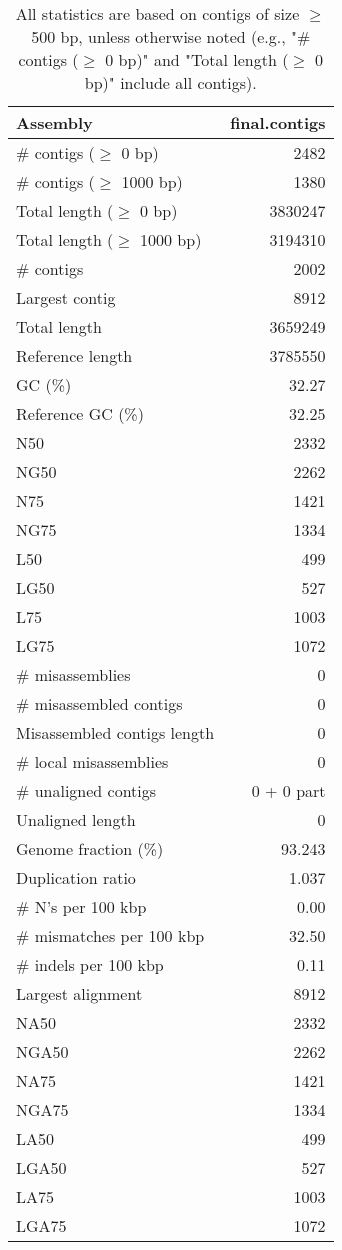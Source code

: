 \documentclass[12pt,a4paper]{article}
\begin{document}
\begin{table}[ht]
\begin{center}
\caption{All statistics are based on contigs of size $\geq$ 500 bp, unless otherwise noted (e.g., "\# contigs ($\geq$ 0 bp)" and "Total length ($\geq$ 0 bp)" include all contigs).}
\begin{tabular}{|l*{1}{|r}|}
\hline
Assembly & final.contigs \\ \hline
\# contigs ($\geq$ 0 bp) & 2482 \\ \hline
\# contigs ($\geq$ 1000 bp) & 1380 \\ \hline
Total length ($\geq$ 0 bp) & 3830247 \\ \hline
Total length ($\geq$ 1000 bp) & 3194310 \\ \hline
\# contigs & 2002 \\ \hline
Largest contig & 8912 \\ \hline
Total length & 3659249 \\ \hline
Reference length & 3785550 \\ \hline
GC (\%) & 32.27 \\ \hline
Reference GC (\%) & 32.25 \\ \hline
N50 & 2332 \\ \hline
NG50 & 2262 \\ \hline
N75 & 1421 \\ \hline
NG75 & 1334 \\ \hline
L50 & 499 \\ \hline
LG50 & 527 \\ \hline
L75 & 1003 \\ \hline
LG75 & 1072 \\ \hline
\# misassemblies & 0 \\ \hline
\# misassembled contigs & 0 \\ \hline
Misassembled contigs length & 0 \\ \hline
\# local misassemblies & 0 \\ \hline
\# unaligned contigs & 0 + 0 part \\ \hline
Unaligned length & 0 \\ \hline
Genome fraction (\%) & 93.243 \\ \hline
Duplication ratio & 1.037 \\ \hline
\# N's per 100 kbp & 0.00 \\ \hline
\# mismatches per 100 kbp & 32.50 \\ \hline
\# indels per 100 kbp & 0.11 \\ \hline
Largest alignment & 8912 \\ \hline
NA50 & 2332 \\ \hline
NGA50 & 2262 \\ \hline
NA75 & 1421 \\ \hline
NGA75 & 1334 \\ \hline
LA50 & 499 \\ \hline
LGA50 & 527 \\ \hline
LA75 & 1003 \\ \hline
LGA75 & 1072 \\ \hline
\end{tabular}
\end{center}
\end{table}
\end{document}
